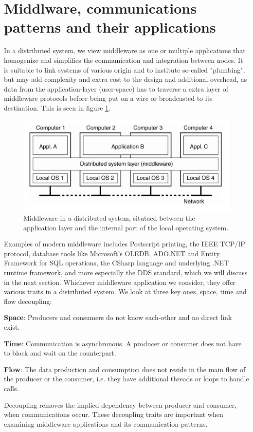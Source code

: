 \section{Middlware, communications patterns and their applications}

In a distributed system, we view middleware as one or multiple applications that homogenize and simplifies the communication and integration between nodes. It is suitable to link systems of various origin and to institute so-called "plumbing", but may add complexity and extra cost to the design and additional overhead, as data from the application-layer (user-space) has to traverse a extra layer of middleware protocols before being put on a wire or broadcasted to its destination. This is seen in figure \ref{fig:middleware}. 

\begin{figure}[h!]\label{}
	\centering
	\includegraphics[scale=0.5]{middleware/middlewaredist.png}
	\caption{Middleware in a distributed system, situtaed between the application layer and the internal part of the local operating system.}
	\label{fig:middleware}
\end{figure}

Examples of modern middleware includes Postscript printing, the IEEE TCP/IP protocol, database tools like Microsoft's OLEDB, ADO.NET and Entity Framework for SQL operations, the CSharp language and underlying .NET runtime framework, and more especially the DDS standard, which we will discuss in the next section. Whichever middleware application we consider, they offer various traits in a distributed system. We look at three key ones, space, time and flow decoupling:

\textbf{Space}: Producers and consumers do not know each-other and no direct link exist.

\textbf{Time}: Communication is asynchronous. A producer or consumer does not have to block and wait on the counterpart.

\textbf{Flow}: The data production and consumption does not reside in the main flow of the producer or the consumer, i.e. they have additional threads or loops to handle calls.

Decoupling removes the implied dependency between producer and consumer, when communications occur. These decoupling traits are important when examining middleware applications and its communication-patterns.




